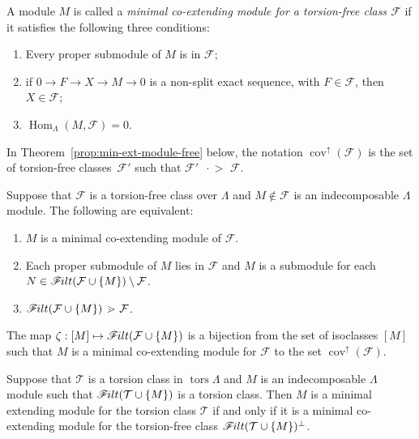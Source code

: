 \documentclass[ALCO,ThmDefs,Unicode,epreuves]{cedram}
\DeclareMathOperator{\tors}{tors}
\DeclareMathOperator{\Hom}{Hom}
\DeclareMathOperator{\cov}{cov}
\newcommand{\calF}{\mathcal{F}}
\newcommand{\calT}{\mathcal{T}}
\newcommand{\filt}{\mathscr{F}\Mk ilt}
\newcommand{\covers}{{\,\,\,\cdot\!\!\!\! >\,\,}}
\newcommand{\covup}{\cov^{\uparrow}}
\renewcommand{\1}{\hat{1}}
\newcommand{\0}{\hat{0}}
\newcommand{\newword}[1]{\emph{#1}}
\newcommand*{\Mk}{\mkern -2mu}
\begin{document}
\begin{definition}
A module $M$ is called a \newword{minimal co-extending module for a torsion-free class $\calF$} if it satisfies the following
three conditions:
\begin{enumerate}[label={(P\arabic*$'$)}]
\item \label{copropertyone} Every proper submodule of $M$ is
 in $\calF$;
\item \label{copropertytwo} if $0\rightarrow F \rightarrow X
 \rightarrow M \rightarrow 0$ is a non-split exact sequence, with
 $F\in \calF$, then $X\in \calF$;
\item\label{copropertythree} $\Hom_\Lambda(M,\calF)=0$.
\end{enumerate}
\end{definition}
In Theorem~\ref{prop:min-ext-module-free} below, the notation $\covup(\calF)$ is the set of torsion-free classes~$\calF'$ such that $\calF' \covers \calF$.
\begin{theorem}\label{prop:min-ext-module-free}
Suppose that $\calF$ is a torsion-free class over $\Lambda$ and $M\not\in \calF$ is an indecomposable $\Lambda$ module.
The following are equivalent:
\begin{enumerate}
\item $M$ is a minimal co-extending module of $\calF$.
\item Each proper submodule of $M$ lies in $\calF$ and $M$ is a submodule for each $N\in \filt(\calF\cup \{M\})\setminus \calF$.
\item $\filt(\calF \cup\{M\}) \covers \calF$.
\end{enumerate}
The map $\zeta: [M]\mapsto \filt(\calF\cup \{M\})$ is a bijection from the set of isoclasses $[M]$ such that $M$ is a minimal co-extending module for $\calF$ to the set $\covup(\calF)$.
\end{theorem}


\begin{proposition}\label{prop:torsion-free-to-torsion-relation}
Suppose that $\calT$ is a torsion class in $\tors \Lambda$ and $M$ is
an indecomposable $\Lambda$ module such that $\filt(\calT \cup \{M\})$
is a torsion class. Then $M$ is a minimal extending module for the torsion class $\calT$ if and only if it is a minimal co-extending module for the torsion-free class $\filt(\calT \cup\{M\})^\perp$.
\end{proposition}
\end{document}
